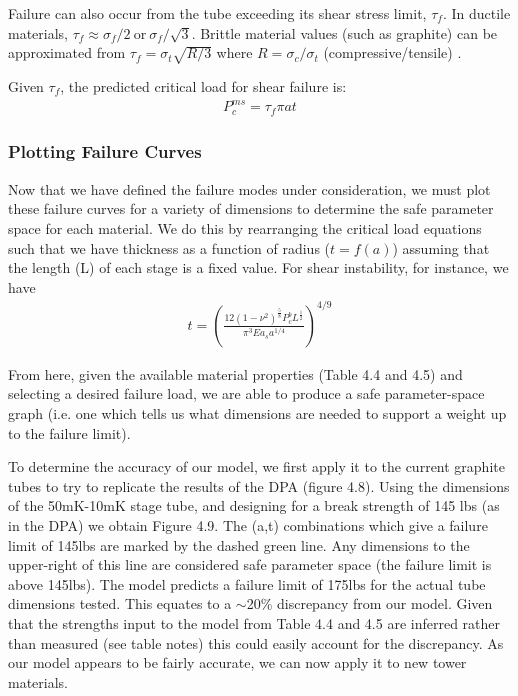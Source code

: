 \documentclass{report}
\begin{document}
Failure can also occur from the tube exceeding its shear stress limit, $\tau_{f}$. In ductile materials, $\tau_{f} \approx \sigma_{f}/2 \ \text{or} \ \sigma_{f}/\sqrt{3}$. Brittle material values (such as graphite) can be approximated from $\tau_{f} = \sigma_{t}\sqrt{R/3} $ where $R = \sigma_{c}/\sigma_{t}$ (compressive/tensile) \cite{Ely1965}.

Given $\tau_{f}$, the predicted critical load for shear failure is:
\begin{eqnarray}
P_{c}^{ms} = \tau_{f}\pi at
\end{eqnarray}

\subsubsection{Plotting Failure Curves}

Now that we have defined the failure modes under consideration, we must plot these failure curves for a variety of dimensions to determine the safe parameter space for each material. We do this by rearranging the critical load equations such that we have thickness as a function of radius ($t = f(a)$) assuming that the length (L) of each stage is a fixed value. For shear instability, for instance, we have
\begin{eqnarray}
t = \left(\frac{12(1-\nu^2)^\frac{5}{8}P_{c}^b L^\frac{1}{2}}{\pi^3 E a_s a^{1/4}}\right)^{4/9}
\end{eqnarray}

From here, given the available material properties (Table 4.4 and 4.5) and selecting a desired failure load, we are able to produce a safe parameter-space graph (i.e. one which tells us what dimensions are needed to support a weight up to the failure limit).

To determine the accuracy of our model, we first apply it to the current graphite tubes to try to replicate the results of the DPA (figure 4.8). Using the dimensions of the 50mK-10mK stage tube, and designing for a break strength of 145 lbs (as in the DPA) we obtain Figure 4.9.  The (a,t) combinations which give a failure limit of 145lbs are marked by the dashed green line. Any dimensions to the upper-right of this line are considered safe parameter space (the failure limit is above 145lbs). The model predicts a failure limit of 175lbs for the actual tube dimensions tested. This equates to a $\sim$20\% discrepancy from our model. Given that the strengths input to the model from Table 4.4 and 4.5 are inferred rather than measured (see table notes) this could easily account for the discrepancy. As our model appears to be fairly accurate, we can now apply it to new tower materials.
\end{document}

